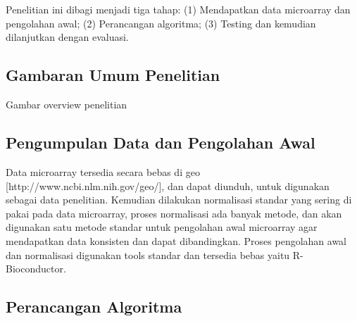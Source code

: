 \chapter{\babTiga}
Penelitian ini dibagi menjadi tiga tahap: (1) Mendapatkan data microarray dan pengolahan awal; (2) Perancangan algoritma; (3) Testing dan kemudian dilanjutkan dengan evaluasi.


\section{Gambaran Umum Penelitian}
Gambar overview penelitian

\section{Pengumpulan Data dan Pengolahan Awal}

Data microarray tersedia secara bebas di geo [http://www.ncbi.nlm.nih.gov/geo/], dan dapat diunduh, untuk digunakan sebagai data penelitian. Kemudian dilakukan normalisasi standar yang sering di pakai pada data microarray, proses normalisasi ada banyak metode, dan akan digunakan satu metode standar untuk pengolahan awal microarray agar mendapatkan data konsisten dan dapat dibandingkan. Proses pengolahan awal dan normalisasi digunakan tools standar dan tersedia bebas yaitu R-Bioconductor.


\section{Perancangan Algoritma}


